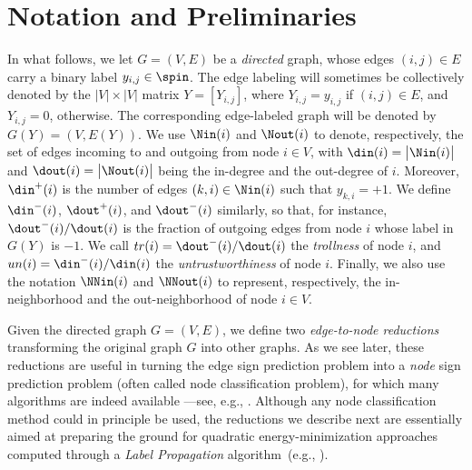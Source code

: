 
\section{Notation and Preliminaries}\label{s:prel}
%
In what follows, we let $G=(V,E)$ be a {\em directed} graph, whose edges $(i,j) \in E$ carry a binary label $y_{i,j}\in \spin$. The edge labeling will sometimes be collectively denoted by the $|V|\times |V|$ matrix $Y = [Y_{i,j}]$, where $Y_{i,j} = y_{i,j}$ if $(i,j) \in E$, and $Y_{i,j} = 0$, otherwise. The corresponding edge-labeled graph will be denoted by $G(Y) = (V,E(Y))$. We use $\Nin(i)$ and $\Nout(i)$ to denote, respectively, the set of edges incoming to and outgoing from node $i \in V$, with $\din(i) = \big|\Nin(i)\big|$ and $\dout(i) = \big|\Nout(i)\big|$ being the in-degree and the out-degree of $i$. Moreover, $\din^+(i)$ is the number of edges $(k,i)\in\Nin(i)$ such that $y_{k,i} = +1$. We define $\din^-(i)$, $\dout^+(i)$, and $\dout^-(i)$ similarly, so that, for instance, $\dout^-(i)/\dout(i)$ is the fraction of outgoing edges from node $i$ whose label in $G(Y)$ is $-1$. We call $tr(i) = \dout^-(i)/\dout(i)$ the {\em trollness} of node $i$, and $un(i) = \din^-(i)/\din(i)$ the {\em untrustworthiness} of node $i$. Finally, we also use the notation $\NNin(i)$ and $\NNout(i)$ to represent, respectively, the in-neighborhood and the out-neighborhood of node $i \in V$.

Given the directed graph $G = (V,E)$, we define two {\em edge-to-node reductions} transforming the original graph $G$ into other graphs. As we see later, these reductions are useful in turning the edge sign prediction problem into a {\em node} sign prediction problem (often called node classification problem), for which many algorithms are indeed available
---see, e.g., \cite{BC01,LabelPropa03,HP07,HLP09,WTA13}.
Although any node classification method could in principle be used, the reductions we describe next are essentially aimed at preparing the ground for quadratic energy-minimization approaches computed through a {\em Label Propagation} algorithm~(e.g., \cite{LabelPropa03,BDL06}).

